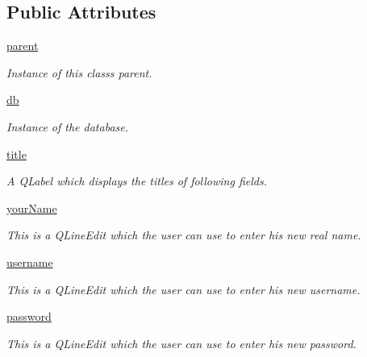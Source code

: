 \subsection*{Public Attributes}
\begin{DoxyCompactItemize}
\item 
\hyperlink{classsrc_1_1settings__menu_1_1_account_settings_menu_afe50b3829d1054937762620263272c4b}{parent}
\begin{DoxyCompactList}\small\item\em Instance of this class\textquotesingle{}s parent. \end{DoxyCompactList}\item 
\hyperlink{classsrc_1_1settings__menu_1_1_account_settings_menu_a793f0abcc421d4f7e51d6ff02e3e86ea}{db}
\begin{DoxyCompactList}\small\item\em Instance of the database. \end{DoxyCompactList}\item 
\hyperlink{classsrc_1_1settings__menu_1_1_account_settings_menu_a6f5f05b647982a9776c96ea5ca254068}{title}
\begin{DoxyCompactList}\small\item\em A Q\+Label which displays the titles of following fields. \end{DoxyCompactList}\item 
\hyperlink{classsrc_1_1settings__menu_1_1_account_settings_menu_a72d6db1fc6e6253916fec2090e8ff914}{your\+Name}
\begin{DoxyCompactList}\small\item\em This is a Q\+Line\+Edit which the user can use to enter his new real name. \end{DoxyCompactList}\item 
\hyperlink{classsrc_1_1settings__menu_1_1_account_settings_menu_a54d0681d7b2c05bc084bf686a5e0cf41}{username}
\begin{DoxyCompactList}\small\item\em This is a Q\+Line\+Edit which the user can use to enter his new username. \end{DoxyCompactList}\item 
\hyperlink{classsrc_1_1settings__menu_1_1_account_settings_menu_a11ded2b607c6b7e0b756eef17952b1f6}{password}
\begin{DoxyCompactList}\small\item\em This is a Q\+Line\+Edit which the user can use to enter his new password. \end{DoxyCompactList}\item 

\end{DoxyCompactItemize}
